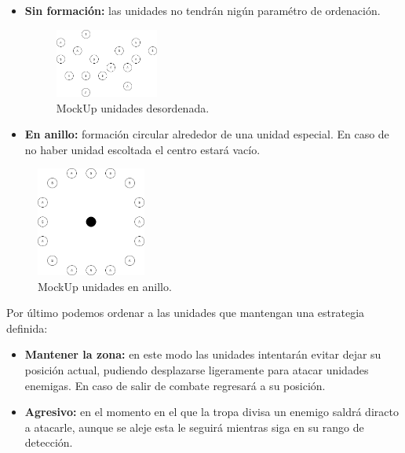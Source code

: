 \begin{itemize}


\item \textbf{Sin formación:} las unidades no tendrán nigún paramétro de ordenación.

\begin{figure}[ht]
\centering
\includegraphics[width=0.32\textwidth]{imagenes/gdd/Formacion-desordenada.png}
\caption{MockUp unidades desordenada.}
\label{mockup_desordenada}
\end{figure}

\item \textbf{En anillo:} formación circular alrededor de una unidad especial. En caso de
no haber unidad escoltada el centro estará vacío. 
\end{itemize} 


\begin{figure}[ht]
\centering
\includegraphics[width=0.32\textwidth]{imagenes/gdd/Formacion-anillo.png}
\caption{MockUp unidades en anillo.}
\label{mockup_anillo}
\end{figure}

Por último podemos ordenar a las unidades que mantengan una estrategia definida:

\begin{itemize}
\item \textbf{Mantener la zona:} en este modo las unidades intentarán evitar dejar su posición
actual, pudiendo desplazarse ligeramente para atacar unidades enemigas. En caso de salir de combate
regresará a su posición.

\item \textbf{Agresivo:} en el momento en el que la tropa divisa un enemigo saldrá diracto a atacarle,
aunque se aleje esta le seguirá mientras siga en su rango de detección.
\end{itemize} 

